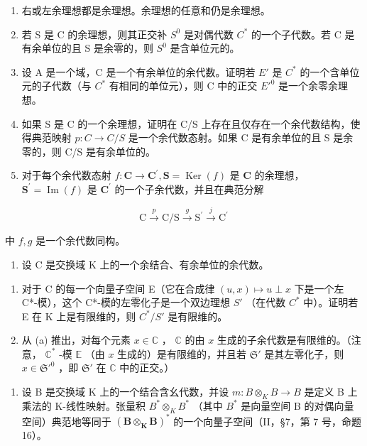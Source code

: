 \begin{enumerate}
\def\labelenumi{(\alph{enumi})}
\item
  右或左余理想都是余理想。余理想的任意和仍是余理想。
\item
  若 S 是 C 的余理想，则其正交补 \(S^{0}\) 是对偶代数 \(C^{*}\) 的一个子代数。若 C 是有余单位的且 S 是余零的，则 \(S^{0}\) 是含单位元的。
\item
  设 A 是一个域，C 是一个有余单位的余代数。证明若 \(E'\) 是 \(C^{*}\) 的一个含单位元的子代数（与 \(C^{*}\) 有相同的单位元），则 C 中的正交 \(E'^{0}\) 是一个余零余理想。
\item
  如果 S 是 C 的一个余理想，证明在 C/S 上存在且仅存在一个余代数结构，使得典范映射 \(p: C \rightarrow C/S\) 是一个余代数态射。如果 C 是有余单位的且 S 是余零的，则 C/S 是有余单位的。
\item
  对于每个余代数态射 \(f\colon\mathbf{C}\to\mathbf{C}^{\prime},\mathbf{S}=\operatorname{Ker}(f)\) 是 \(\mathbf{C}\) 的余理想， \(\mathbf{S}^{\prime}=\operatorname{Im}(f)\) 是 \(\mathbf{C}^{\prime}\) 的一个子余代数，并且在典范分解
\end{enumerate}

\[
\mathrm{C} \xrightarrow {p} \mathrm{C} / \mathrm{S} \xrightarrow {g} \mathrm{S} ^ {\prime} \xrightarrow {j} \mathrm{C} ^ {\prime}
\]

中 \(f, g\) 是一个余代数同构。

\begin{enumerate}
\def\labelenumi{(\arabic{enumi})}
\setcounter{enumi}{25}
\tightlist
\item
  设 C 是交换域 K 上的一个余结合、有余单位的余代数。
\end{enumerate}

\begin{enumerate}
\def\labelenumi{(\alph{enumi})}
\item
  对于 C 的每一个向量子空间 E（它在合成律 \((u, x) \mapsto u \perp x\) 下是一个左 C*-模），这个 C*-模的左零化子是一个双边理想 \(S'\) （在代数 \(C^*\) 中）。证明若 E 在 K 上是有限维的，则 \(C^*/S'\) 是有限维的。
\item
  从 (a) 推出，对每个元素 \(x \in \mathbb{C}\) ， \(\mathbb{C}\) 的由 \(x\) 生成的子余代数是有限维的。（注意， \(\mathbb{C}^*\) -模 \(\mathbb{E}\) （由 \(x\) 生成的）是有限维的，并且若 \(\mathfrak{S}'\) 是其左零化子，则 \(x \in \mathfrak{S}'^0\) ，即 \(\mathfrak{S}'\) 在 \(\mathbb{C}\) 中的正交。）
\end{enumerate}

\begin{enumerate}
\def\labelenumi{(\arabic{enumi})}
\setcounter{enumi}{26}
\tightlist
\item
  设 B 是交换域 K 上的一个结合含幺代数，并设 \(m: B \otimes_{K} B \to B\) 是定义 B 上乘法的 K-线性映射。张量积 \(B^{*} \otimes_{K} B^{*}\) （其中 \(B^{*}\) 是向量空间 B 的对偶向量空间）典范地等同于 \((\mathbf{B} \otimes_{\mathbf{K}} \mathbf{B})^{*}\) 的一个向量子空间（II，§7，第 7 号，命题 16）。
\end{enumerate}

